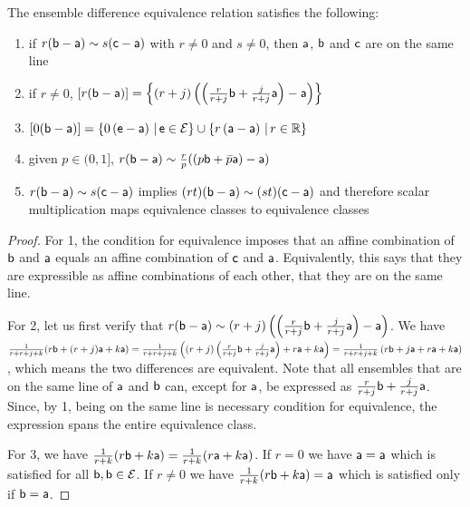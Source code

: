 \begin{mathSection}
	\begin{prop}
		The ensemble difference equivalence relation satisfies the following:
		\begin{enumerate}
			\item if $r(\ens[b] - \ens[a]) \sim s(\ens[c] - \ens[a])$ with $r\neq0$ and $s\neq0$, then $\ens[a]$, $\ens[b]$ and $\ens[c]$ are on the same line
			\item if $r\neq0$, $[r(\ens[b] - \ens[a])] = \left\{(r+j)\left(\left(\frac{r}{r+j}\ens[b] +\frac{j}{r+j} \ens[a]\right) -\ens[a]\right)\right\}$
			\item $\left[0(\ens[b] - \ens[a])\right] = \left\{0\left(\ens - \ens[a]\right) \, | \, \ens \in \Ens \right\} \cup \left\{r\left(\ens[a] - \ens[a]\right) \, | \, r \in \mathbb{R} \right\}$
			\item given $p \in (0,1]$, $r(\ens[b] - \ens[a]) \sim \frac{r}{p}((p\ens[b] + \bar{p}\ens[a]) - \ens[a])$
			\item $r(\ens[b] - \ens[a]) \sim s(\ens[c] - \ens[a])$ implies $(rt)(\ens[b] - \ens[a]) \sim (st)(\ens[c] - \ens[a])$ and therefore scalar multiplication maps equivalence classes to equivalence classes
		\end{enumerate}
	\end{prop}
	
	\begin{proof}
		For 1, the condition for equivalence imposes that an affine combination of $\ens[b]$ and $\ens[a]$ equals an affine combination of $\ens[c]$ and $\ens[a]$. Equivalently, this says that they are expressible as affine combinations of each other, that they are on the same line.
		
		For 2, let us first verify that $r(\ens[b] - \ens[a]) \sim (r+j)\left(\left(\frac{r}{r+j}\ens[b] +\frac{j}{r+j} \ens[a]\right) -\ens[a]\right)$. We have $\frac{1}{r+r+j+k} (r \ens[b] + (r+j) \ens[a] + k \ens[a]) = \frac{1}{r+r+j+k} \left((r+j)\left(\frac{r}{r+j}\ens[b] +\frac{j}{r+j} \ens[a]\right) + r \ens[a] + k \ens[a]\right)=\frac{1}{r+r+j+k} \left(r\ens[b] +j\ens[a] + r \ens[a] + k \ens[a]\right)$, which means the two differences are equivalent. Note that all ensembles that are on the same line of $\ens[a]$ and $\ens[b]$ can, except for $\ens[a]$, be expressed as $\frac{r}{r+j}\ens[b] +\frac{j}{r+j} \ens[a]$. Since, by 1, being on the same line is necessary condition for equivalence, the expression spans the entire equivalence class.
		
		For 3, we have $\frac{1}{r+k} (r \ens[b] + k \ens[a]) = \frac{1}{r+k} (r \ens[a] + k \ens[a])$. If $r=0$ we have $\ens[a] = \ens[a]$ which is satisfied for all $\ens[b], \ens[b] \in \Ens$. If $r\neq0$ we have $\frac{1}{r+k} (r \ens[b] + k \ens[a]) = \ens[a]$ which is satisfied only if $\ens[b] = \ens[a]$.
		

\end{proof}
\end{mathSection}
